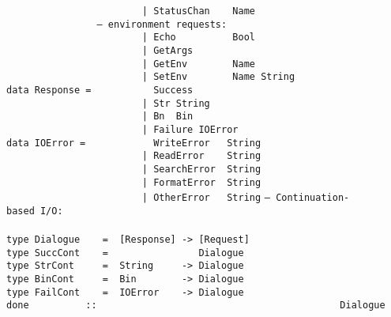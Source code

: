 \mbox{\tt \ \ \ \ \ \ \ \ \ \ \ \ \ \ \ \ \ \ \ \ \ \ \ \ |\ StatusChan\ \ \ \ Name}\\
\mbox{\tt \ \ \ \ \ \ \ \ \ \ \ \ \ \ \ \ --\ environment\ requests:}\\
\mbox{\tt \ \ \ \ \ \ \ \ \ \ \ \ \ \ \ \ \ \ \ \ \ \ \ \ |\ Echo\ \ \ \ \ \ \ \ \ \ Bool}\\
\mbox{\tt \ \ \ \ \ \ \ \ \ \ \ \ \ \ \ \ \ \ \ \ \ \ \ \ |\ GetArgs}\\
\mbox{\tt \ \ \ \ \ \ \ \ \ \ \ \ \ \ \ \ \ \ \ \ \ \ \ \ |\ GetEnv\ \ \ \ \ \ \ \ Name}\\
\mbox{\tt \ \ \ \ \ \ \ \ \ \ \ \ \ \ \ \ \ \ \ \ \ \ \ \ |\ SetEnv\ \ \ \ \ \ \ \ Name\ String}
\eprogB\noindent\bprogB
\mbox{\tt data\ Response\ =\ \ \ \ \ \ \ \ \ \ \ Success}\\
\mbox{\tt \ \ \ \ \ \ \ \ \ \ \ \ \ \ \ \ \ \ \ \ \ \ \ \ |\ Str\ String\ }\\
\mbox{\tt \ \ \ \ \ \ \ \ \ \ \ \ \ \ \ \ \ \ \ \ \ \ \ \ |\ Bn\ \ Bin}\\
\mbox{\tt \ \ \ \ \ \ \ \ \ \ \ \ \ \ \ \ \ \ \ \ \ \ \ \ |\ Failure\ IOError}
\eprogB\noindent\bprogB
\mbox{\tt data\ IOError\ =\ \ \ \ \ \ \ \ \ \ \ \ WriteError\ \ \ String}\\
\mbox{\tt \ \ \ \ \ \ \ \ \ \ \ \ \ \ \ \ \ \ \ \ \ \ \ \ |\ ReadError\ \ \ \ String}\\
\mbox{\tt \ \ \ \ \ \ \ \ \ \ \ \ \ \ \ \ \ \ \ \ \ \ \ \ |\ SearchError\ \ String}\\
\mbox{\tt \ \ \ \ \ \ \ \ \ \ \ \ \ \ \ \ \ \ \ \ \ \ \ \ |\ FormatError\ \ String}\\
\mbox{\tt \ \ \ \ \ \ \ \ \ \ \ \ \ \ \ \ \ \ \ \ \ \ \ \ |\ OtherError\ \ \ String}
\eprogB\noindent\bprogB
\mbox{\tt --\ Continuation-based\ I/O:}\\
\mbox{\tt }\\
\mbox{\tt type\ Dialogue\ \ \ \ =\ \ [Response]\ ->\ [Request]}\\
\mbox{\tt type\ SuccCont\ \ \ \ =\ \ \ \ \ \ \ \ \ \ \ \ \ \ \ \ Dialogue}\\
\mbox{\tt type\ StrCont\ \ \ \ \ =\ \ String\ \ \ \ \ ->\ Dialogue}\\
\mbox{\tt type\ BinCont\ \ \ \ \ =\ \ Bin\ \ \ \ \ \ \ \ ->\ Dialogue}\\
\mbox{\tt type\ FailCont\ \ \ \ =\ \ IOError\ \ \ \ ->\ Dialogue}
\eprogB\noindent\bprogB
\mbox{\tt done\ \ \ \ \ \ \ \ \ \ ::\ \ \ \ \ \ \ \ \ \ \ \ \ \ \ \ \ \ \ \ \ \ \ \ \ \ \ \ \ \ \ \ \ \ \ \ \ \ \ \ \ \ \ Dialogue}\\

